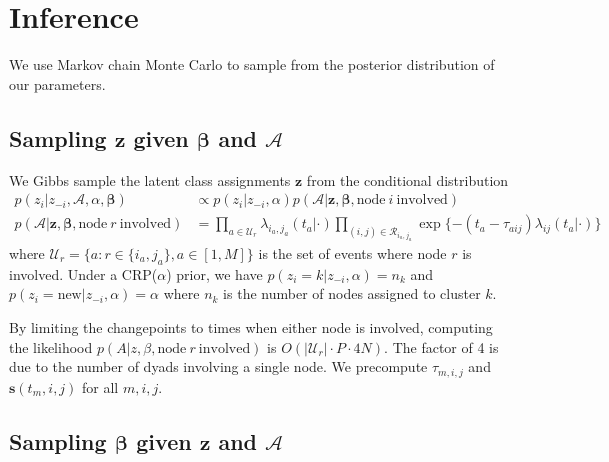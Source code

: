 \documentclass{article}
\begin{document}
\section{Inference}

We use Markov chain Monte Carlo to sample from the posterior distribution of our parameters.  

\subsection*{Sampling $\mathbf{z}$ given $\boldsymbol{\beta}$ and $\mathcal{A}$ }

We Gibbs sample the latent class assignments $\mathbf{z}$ from the conditional distribution
\begin{align*}
p(z_i | z_{-i},\mathcal{A},\alpha,\boldsymbol{\beta}) &\propto p(z_i | z_{-i},\alpha) p(\mathcal{A}|\mathbf{z},\boldsymbol{\beta},\mbox{node} \ i \ \mbox{involved}) \\
p(\mathcal{A}|\mathbf{z},\boldsymbol{\beta},\mbox{node} \ r \ \mbox{involved}) &= \prod_{a \in \mathcal{U}_r} \lambda_{i_a,j_a}(t_a|\cdot)
\prod_{(i,j) \in \mathcal{R}_{i_a,j_a}} \exp \{ -(t_a - \tau_{aij}) \lambda_{ij}(t_a|\cdot)\}
\end{align*}
where $\mathcal{U}_r = \{a: r \in \{i_a,j_a\}, a \in [1,M]\}$ is the set of events where node $r$ is involved.  Under a CRP($\alpha$) prior, we have $p(z_i = k | z_{-i},\alpha) = n_k $ and $p(z_i = \mbox{new} |  z_{-i},\alpha) = \alpha$ where $n_k$ is the number of nodes assigned to cluster $k$. 


 By limiting the changepoints to times when either node is involved, computing the likelihood $p(A|z,\beta,\mbox{node} \ r \ \mbox{involved})$ is $O(|\mathcal{U}_r| \cdot P \cdot 4N)$.  The factor of 4 is due to the number of dyads involving a single node.  We precompute $\tau_{m,i,j}$ and $\mathbf{s}(t_m,i,j)$ for all $m,i,j$. 


\subsection{Sampling $\boldsymbol{\beta}$ given $\mathbf{z}$ and $\mathcal{A}$ }
\end{document}
